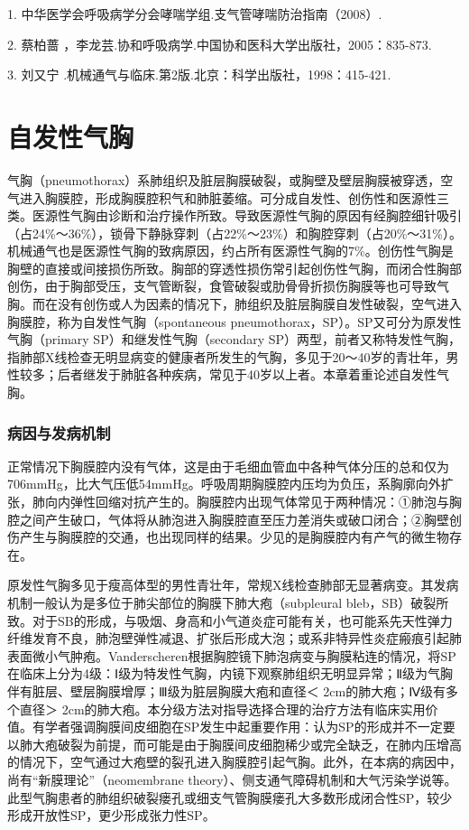 1. 中华医学会呼吸病学分会哮喘学组.支气管哮喘防治指南（2008）.

2. 蔡柏蔷 ，李龙芸.协和呼吸病学.中国协和医科大学出版社，2005：835-873.

3. 刘又宁 .机械通气与临床.第2版.北京：科学出版社，1998：415-421.

\protect\hypertarget{text00270.html}{}{}

\chapter{自发性气胸}

气胸（pneumothorax）系肺组织及脏层胸膜破裂，或胸壁及壁层胸膜被穿透，空气进入胸膜腔，形成胸膜腔积气和肺脏萎缩。可分成自发性、创伤性和医源性三类。医源性气胸由诊断和治疗操作所致。导致医源性气胸的原因有经胸腔细针吸引（占24\%～36\%），锁骨下静脉穿刺（占22\%～23\%）和胸腔穿刺（占20\%～31\%）。机械通气也是医源性气胸的致病原因，约占所有医源性气胸的7\%。创伤性气胸是胸壁的直接或间接损伤所致。胸部的穿透性损伤常引起创伤性气胸，而闭合性胸部创伤，由于胸部受压，支气管断裂，食管破裂或肋骨骨折损伤胸膜等也可导致气胸。而在没有创伤或人为因素的情况下，肺组织及脏层胸膜自发性破裂，空气进入胸膜腔，称为自发性气胸（spontaneous
pneumothorax，SP）。SP又可分为原发性气胸（primary
SP）和继发性气胸（secondary
SP）两型，前者又称特发性气胸，指肺部X线检查无明显病变的健康者所发生的气胸，多见于20～40岁的青壮年，男性较多；后者继发于肺脏各种疾病，常见于40岁以上者。本章着重论述自发性气胸。

\subsection{病因与发病机制}

正常情况下胸膜腔内没有气体，这是由于毛细血管血中各种气体分压的总和仅为706mmHg，比大气压低54mmHg。呼吸周期胸膜腔内压均为负压，系胸廓向外扩张，肺向内弹性回缩对抗产生的。胸膜腔内出现气体常见于两种情况：①肺泡与胸腔之间产生破口，气体将从肺泡进入胸膜腔直至压力差消失或破口闭合；②胸壁创伤产生与胸膜腔的交通，也出现同样的结果。少见的是胸膜腔内有产气的微生物存在。

原发性气胸多见于瘦高体型的男性青壮年，常规X线检查肺部无显著病变。其发病机制一般认为是多位于肺尖部位的胸膜下肺大疱（subpleural
bleb，SB）破裂所致。对于SB的形成，与吸烟、身高和小气道炎症可能有关，也可能系先天性弹力纤维发育不良，肺泡壁弹性减退、扩张后形成大泡；或系非特异性炎症瘢痕引起肺表面微小气肿疱。Vanderscheren根据胸腔镜下肺泡病变与胸膜粘连的情况，将SP在临床上分为4级：Ⅰ级为特发性气胸，内镜下观察肺组织无明显异常；Ⅱ级为气胸伴有脏层、壁层胸膜增厚；Ⅲ级为脏层胸膜大疱和直径＜
2cm的肺大疱；Ⅳ级有多个直径＞
2cm的肺大疱。本分级方法对指导选择合理的治疗方法有临床实用价值。有学者强调胸膜间皮细胞在SP发生中起重要作用：认为SP的形成并不一定要以肺大疱破裂为前提，而可能是由于胸膜间皮细胞稀少或完全缺乏，在肺内压增高的情况下，空气通过大疱壁的裂孔进入胸膜腔引起气胸。此外，在本病的病因中，尚有“新膜理论”（neomembrane
theory）、侧支通气障碍机制和大气污染学说等。此型气胸患者的肺组织破裂瘘孔或细支气管胸膜瘘孔大多数形成闭合性SP，较少形成开放性SP，更少形成张力性SP。


